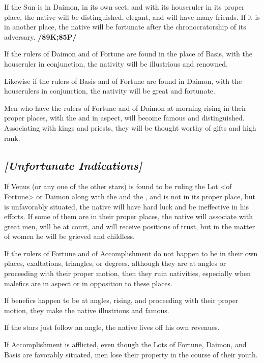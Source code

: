 If the Sun is in Daimon, in its own sect, and with its houseruler in its proper place, the native will be distinguished, elegant, and will have many friends. If it is in another place, the native will be fortunate after the chronocratorship of its adversary. \textbf{/89K;85P/}

If the rulers of Daimon and of Fortune are found in the place of Basis, with the houseruler in conjunction, the nativity will be illustrious and renowned. 

Likewise if the rulers of Basis and of Fortune are found in Daimon, with the houserulers in conjunction, the nativity will be great and fortunate. 

Men who have the rulers of Fortune and of Daimon at morning rising in their proper places, with the \Sun\xspace and \Moon\xspace in aspect, will become famous and distinguished. Associating with kings and priests, they will be thought worthy of gifts and high rank. 

\subsection{\textit{[Unfortunate Indications]}}
If Venus (or any one of the other stars) is found to be ruling the Lot <of Fortune> or Daimon along with the \Sun\xspace and the \Moon, and is not in its proper place, but is unfavorably situated, the native will have hard luck and be ineffective in his efforts. If some of them are in their proper places, the native will associate with great men, will be at court, and will receive positions of trust, but in the matter of women he will be grieved and childless.

If the rulers of Fortune and of Accomplishment  do not happen to be in their own places, exaltations, triangles, or degrees, although they are at angles or proceeding with their proper motion, then they ruin nativities, especially when malefics are in aspect or in opposition to these places. 

If benefics happen to be at angles, rising, and proceeding with their proper motion, they make the native illustrious and famous. 

If the stars just follow an angle, the native lives off his own revenues.

If Accomplishment is afflicted, even though the Lots of Fortune, Daimon, and Basis are favorably situated, men lose their property in the course of their youth. 

